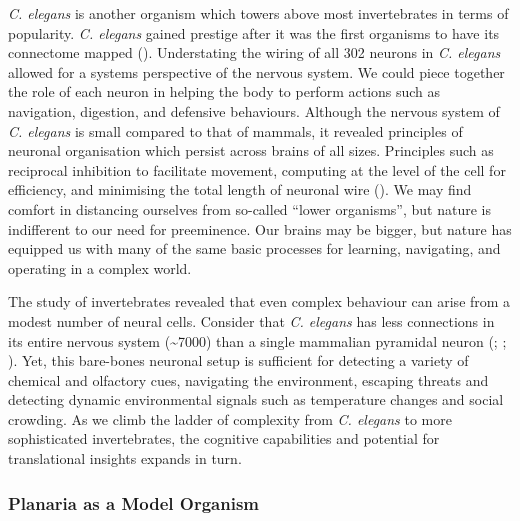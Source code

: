 \documentclass[
  jou,
  floatsintext,
  longtable,
  nolmodern,
  notxfonts,
  notimes,
  donotrepeattitle,
  colorlinks=true,linkcolor=blue,citecolor=blue,urlcolor=blue]{apa7}
\begin{document}
\emph{C. elegans} is another organism which towers above most
invertebrates in terms of popularity. \emph{C. elegans} gained prestige
after it was the first organisms to have its connectome mapped
(). Understating
the wiring of all 302 neurons in \emph{C. elegans} allowed for a systems
perspective of the nervous system. We could piece together the role of
each neuron in helping the body to perform actions such as navigation,
digestion, and defensive behaviours. Although the nervous system of
\emph{C. elegans} is small compared to that of mammals, it revealed
principles of neuronal organisation which persist across brains of all
sizes. Principles such as reciprocal inhibition to facilitate movement,
computing at the level of the cell for efficiency, and minimising the
total length of neuronal wire
().
We may find comfort in distancing ourselves from so-called ``lower
organisms'', but nature is indifferent to our need for preeminence. Our
brains may be bigger, but nature has equipped us with many of the same
basic processes for learning, navigating, and operating in a complex
world.

The study of invertebrates revealed that even complex behaviour can
arise from a modest number of neural cells. Consider that \emph{C.
elegans} has less connections in its entire nervous system
(\textasciitilde7000) than a single mammalian pyramidal neuron
(;
;
).
Yet, this bare-bones neuronal setup is sufficient for detecting a
variety of chemical and olfactory cues, navigating the environment,
escaping threats and detecting dynamic environmental signals such as
temperature changes and social crowding. As we climb the ladder of
complexity from \emph{C. elegans} to more sophisticated invertebrates,
the cognitive capabilities and potential for translational insights
expands in turn.

\subsubsection{Planaria as a Model
Organism}\label{sec-planaria-as-a-model-organism}
\end{document}
